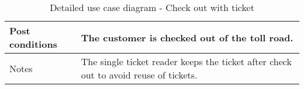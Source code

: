 \begin{table}[H]
\begin{tabular}{| p{3cm}| p{11.5cm}|}
        Post conditions         & The customer is checked out of the toll road. \\\hline
        Notes                   & The single ticket reader keeps the ticket after check out to avoid reuse of tickets. \\\hline
        
    \end{tabular}
    \caption{Detailed use case diagram - Check out with ticket}
    \label{tab:UC2}
\end{table}